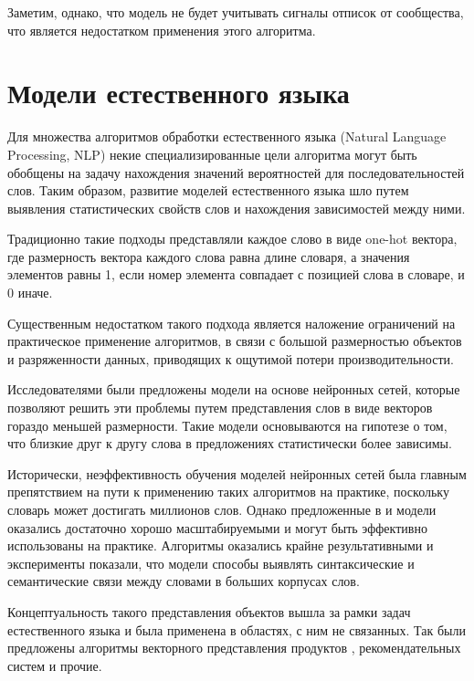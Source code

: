 \documentclass[times,specification,annotation]{itmo-student-thesis}
\begin{document}
Заметим, однако, что модель не будет учитывать сигналы отписок от сообщества, что является недостатком применения этого алгоритма. 

\section{Модели естественного языка}\label{sec:nlp-intro}

Для множества алгоритмов обработки естественного языка (Natural Language Processing, NLP) некие специализированные цели алгоритма могут быть обобщены на задачу нахождения значений вероятностей для последовательностей слов.
Таким образом, развитие моделей естественного языка шло путем выявления статистических свойств слов и нахождения зависимостей между ними.

Традиционно такие подходы представляли каждое слово в виде one-hot вектора, где размерность вектора каждого слова равна длине словаря, а значения элементов равны 1, если номер элемента совпадает с позицией слова в словаре, и 0 иначе.  

Существенным недостатком такого подхода является наложение ограничений на практическое применение алгоритмов, в связи с большой размерностью объектов и разряженности данных, приводящих к ощутимой потери производительности.

Исследователями были предложены модели на основе нейронных сетей\cite{turian2010}, которые позволяют решить эти проблемы путем представления слов в виде векторов гораздо меньшей размерности. Такие модели основываются на гипотезе о том, что близкие друг к другу слова в предложениях статистически более зависимы.

Исторически, неэффективность обучения моделей нейронных сетей была главным препятствием на пути к применению таких алгоритмов на практике, поскольку словарь может достигать миллионов слов. Однако предложенные в \cite{mikolov2013efficient} и \cite{mikolov2013distributed} модели оказались достаточно хорошо масштабируемыми и могут быть эффективно использованы на практике. Алгоритмы оказались крайне результативными и эксперименты показали, что модели способы выявлять синтаксические и семантические связи между словами в больших корпусах слов. 

Концептуальность такого представления объектов вышла за рамки задач естественного языка и была применена в областях, с ним не связанных. Так были предложены алгоритмы векторного представления продуктов \cite{grbovic2015commerce}, рекомендательных систем \cite{ozsoy2016word} и прочие.
\end{document}
